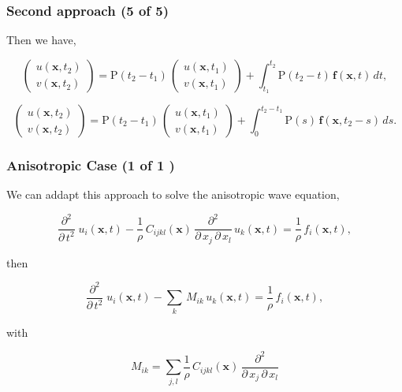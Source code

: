 \documentclass{beamer}
\newcommand{\twovec}[2]{ \left( \begin{array}{c} #1  \\ #2   \end{array} \right) }
\begin{document}
\begin{frame}
\frametitle{Second approach (5 of 5)}
\begin{flushleft}
Then we have,
\end{flushleft}
\begin{equation*}
\twovec{ u(\mathbf{x},t_2) }{ v(\mathbf{x},t_2) }  = \textrm{P}(t_2-t_1) \, \twovec{ u(\mathbf{x},t_1) }{ v(\mathbf{x},t_1) } + \int_{t_1}^{t_2}  \textrm{P}(t_2-t) \, \textbf{f}(\mathbf{x},t) \, dt,
\end{equation*}

\begin{equation*}
\twovec{ u(\mathbf{x},t_2) }{ v(\mathbf{x},t_2) }  = \textrm{P}(t_2-t_1) \, \twovec{ u(\mathbf{x},t_1) }{ v(\mathbf{x},t_1) } + \int_{0}^{t_2-t_1}  \textrm{P}(s) \, \textbf{f}(\mathbf{x},t_2-s) \, ds.
\end{equation*}


\end{frame}



\begin{frame}
\frametitle{Anisotropic Case (1 of 1	)}
\begin{flushleft}
We can addapt this approach to solve the anisotropic wave equation,
\end{flushleft}
\begin{equation*}
\frac{ \partial^2 }{ \partial \, t^2} \; u_i(\mathbf{x},t)  - \frac{1}{\rho} \, C_{ijkl}(\mathbf{x}) \, \frac{\partial^2 }{\partial \, x_j \, \partial \, x_l} \, u_k(\mathbf{x},t) = \frac{1}{\rho} \, f_i(\mathbf{x},t),
\end{equation*}
\begin{flushleft}
then
\end{flushleft}
\begin{equation*}
\frac{ \partial^2 }{ \partial \, t^2} \; u_i(\mathbf{x},t)  - \sum_{k} \, M_{ik} \, u_k(\mathbf{x},t) = \frac{1}{\rho} \, f_i(\mathbf{x},t),
\end{equation*}
\begin{flushleft}
with
\end{flushleft}
\begin{equation*}
M_{ik} = \sum_{j,l} \frac{1}{\rho} \, C_{ijkl}(\mathbf{x}) \, \frac{\partial^2 }{\partial \, x_j \, \partial \, x_l}
\end{equation*}
\end{frame}
\end{document}
